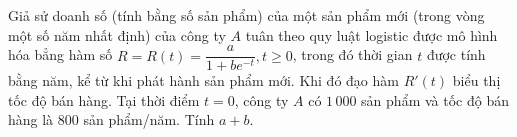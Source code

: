 \begin{bt}%
	Giả sử doanh số (tính bằng số sản phẩm) của một sản phẩm mới (trong vòng một số năm nhất định) của công ty $A$ tuân theo quy luật logistic được mô hình hóa bẳng hàm số $R=R(t)=\dfrac{a}{1+b e^{-t}}, t \geq 0$, trong đó thời gian $t$ được tính bằng năm, kể từ khi phát hành sản phẩm mới. Khi đó đạo hàm $R'(t)$ biểu thị tốc độ bán hàng. Tại thời điểm $t=0$, công ty $A$ có $1\,000$ sản phẩm và tốc độ bán hàng là $800$ sản phẩm/năm. Tính $a+b$.
\end{bt}


